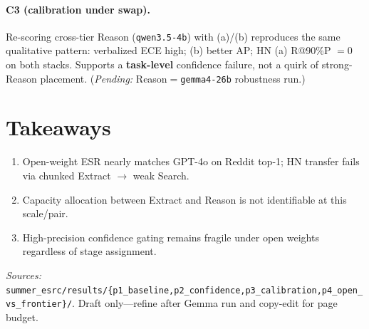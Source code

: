 \documentclass[sigplan,screen,nonacm,10pt]{acmart}
\begin{document}
\paragraph{C3 (calibration under swap).}
Re-scoring cross-tier Reason (\texttt{qwen3.5-4b}) with (a)/(b) reproduces the
same qualitative pattern: verbalized ECE high; (b) better AP; HN (a) R@90\%P
$=0$ on both stacks. Supports a \textbf{task-level} confidence failure, not a
quirk of strong-Reason placement. (\textit{Pending:} Reason$=$\texttt{gemma4-26b}
robustness run.)

\section{Takeaways}
\begin{enumerate}
\item Open-weight ESR nearly matches GPT-4o on Reddit top-1; HN transfer fails
via chunked Extract $\to$ weak Search.
\item Capacity allocation between Extract and Reason is not identifiable at
this scale/pair.
\item High-precision confidence gating remains fragile under open weights
regardless of stage assignment.
\end{enumerate}

\vspace{0.5em}
\noindent\textit{Sources:}
\texttt{summer\_esrc/results/\{p1\_baseline,p2\_confidence,p3\_calibration,p4\_open\_vs\_frontier\}/}.
Draft only---refine after Gemma run and copy-edit for page budget.
\end{document}

